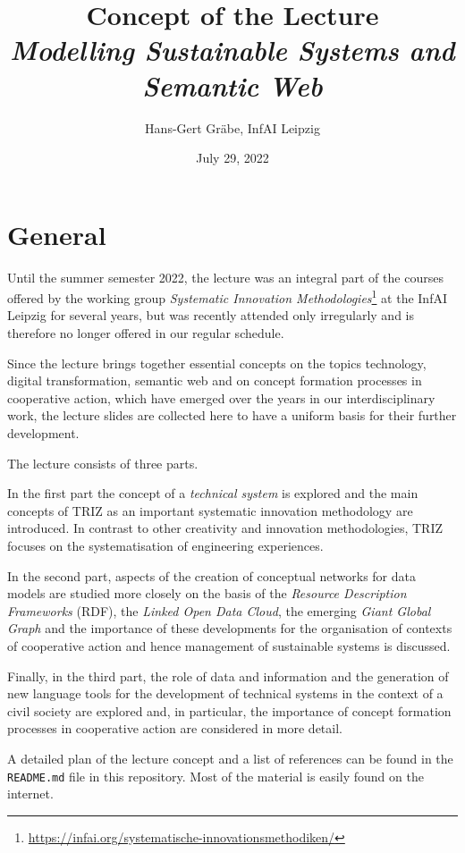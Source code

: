 \documentclass[11pt,a4paper]{article}
\title{Concept of the Lecture \\[.3em] \emph{Modelling Sustainable Systems and
    Semantic Web}}
\author{Hans-Gert Gr\"abe, InfAI Leipzig}
\date{July 29, 2022}
\begin{document}
\maketitle

\section*{General}

Until the summer semester 2022, the lecture was an integral part of the
courses offered by the working group \emph{Systematic Innovation
Methodologies}\footnote{\url{https://infai.org/systematische-innovationsmethodiken/}}
at the InfAI Leipzig for several years, but was recently attended only
irregularly and is therefore no longer offered in our regular schedule.

Since the lecture brings together essential concepts on the topics technology,
digital transformation, semantic web and on concept formation processes in
cooperative action, which have emerged over the years in our interdisciplinary
work, the lecture slides are collected here to have a uniform basis for their
further development.

The lecture consists of three parts.

In the first part the concept of a \emph{technical system} is explored and the
main concepts of TRIZ as an important systematic innovation methodology are
introduced.  In contrast to other creativity and innovation methodologies,
TRIZ focuses on the systematisation of engineering experiences.

In the second part, aspects of the creation of conceptual networks for data
models are studied more closely on the basis of the \emph{Resource Description
Frameworks} (RDF), the \emph{Linked Open Data Cloud}, the emerging \emph{Giant
Global Graph} and the importance of these developments for the organisation of
contexts of cooperative action and hence management of sustainable systems is
discussed.

Finally, in the third part, the role of data and information and the
generation of new language tools for the development of technical systems in
the context of a civil society are explored and, in particular, the importance
of concept formation processes in cooperative action are considered in more
detail.

A detailed plan of the lecture concept and a list of references can be found
in the \texttt{README.md} file in this repository.  Most of the material is
easily found on the internet. 
\newpage
\end{document}
